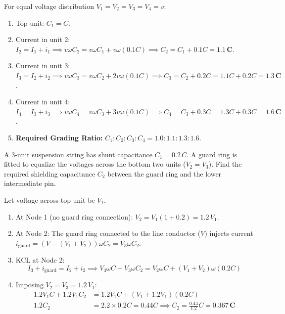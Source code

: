 \documentclass[11pt,a4paper]{article}
\newenvironment{Problem}[1][Numerical Problem]{\begin{tcolorbox}[problembox, title=#1]}{\end{tcolorbox}}
\newenvironment{Solution}[1][Step-by-Step Solution]{\begin{tcolorbox}[solbox, title=#1]}{\end{tcolorbox}}
\begin{document}
\begin{Solution}
For equal voltage distribution $V_1 = V_2 = V_3 = V_4 = v$:
\begin{enumerate}
  \item Top unit: $C_1 = C$.
  \item Current in unit 2: $I_2 = I_1 + i_1 \implies v \omega C_2 = v \omega C_1 + v \omega (0.1 C) \implies C_2 = C_1 + 0.1 C = \mathbf{1.1\,C}$.
  \item Current in unit 3: $I_3 = I_2 + i_2 \implies v \omega C_3 = v \omega C_2 + 2v \omega (0.1 C) \implies C_3 = C_2 + 0.2 C = 1.1C + 0.2C = \mathbf{1.3\,C}$.
  \item Current in unit 4: $I_4 = I_3 + i_3 \implies v \omega C_4 = v \omega C_3 + 3v \omega (0.1 C) \implies C_4 = C_3 + 0.3 C = 1.3C + 0.3C = \mathbf{1.6\,C}$.
  \item \textbf{Required Grading Ratio:} $C_1 : C_2 : C_3 : C_4 = \mathbf{1.0 : 1.1 : 1.3 : 1.6}$.
\end{enumerate}
\end{Solution}

\begin{Problem}[Problem 8: Sizing Guard Ring Shielding Capacitance]
A 3-unit suspension string has shunt capacitance $C_1 = 0.2\,C$. A guard ring is fitted to equalize the voltages across the bottom two units ($V_2 = V_3$). Find the required shielding capacitance $C_2$ between the guard ring and the lower intermediate pin.
\end{Problem}

\begin{Solution}
Let voltage across top unit be $V_1$.
\begin{enumerate}
  \item At Node 1 (no guard ring connection): $V_2 = V_1 (1 + 0.2) = 1.2\,V_1$.
  \item At Node 2: The guard ring connected to the line conductor ($V$) injects current $i_{\text{guard}} = (V - (V_1 + V_2))\omega C_2 = V_3 \omega C_2$.
  \item KCL at Node 2:
    \begin{equation*}
      I_3 + i_{\text{guard}} = I_2 + i_2 \implies V_3 \omega C + V_3 \omega C_2 = V_2 \omega C + (V_1 + V_2)\omega (0.2 C)
    \end{equation*}
  \item Imposing $V_2 = V_3 = 1.2\,V_1$:
    \begin{align*}
      1.2 V_1 C + 1.2 V_1 C_2 &= 1.2 V_1 C + (V_1 + 1.2 V_1)(0.2 C) \\
      1.2 C_2 &= 2.2 \times 0.2 C = 0.44 C \implies C_2 = \frac{0.44}{1.2} C = \mathbf{0.367\,C}
    \end{align*}
\end{enumerate}
\end{Solution}
\end{document}
